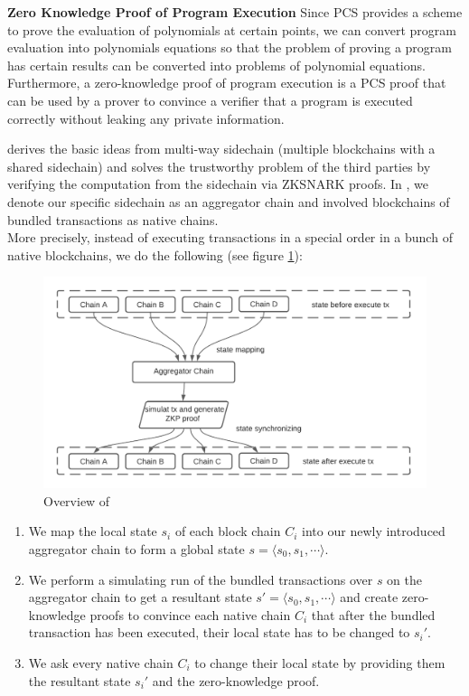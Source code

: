 \documentclass[pageno]{jpaper}
\begin{document}
\smallskip\noindent\textbf{Zero Knowledge Proof of Program Execution}
Since PCS provides a scheme to prove the evaluation of polynomials at certain points, we can convert program evaluation into polynomials equations so that the problem of proving a program has certain results can be converted into problems of polynomial equations. Furthermore, a zero-knowledge proof \cite{cramer1998zero-zkp,kate2010constant-zkp,damgaard1998commitment-zkp} of program execution is a PCS proof that can be used by a prover to convince a verifier that a program is executed correctly without leaking any private information.

\dprotocol derives the basic ideas from multi-way sidechain (multiple blockchains with a shared sidechain) and solves the trustworthy problem of the third parties by verifying the computation from the sidechain via ZKSNARK proofs. In \dprotocol, we denote our specific sidechain as an aggregator chain and involved blockchains of bundled transactions as native chains.\\
\newline
More precisely, instead of executing transactions in a special order in a bunch of native blockchains, we do the following (see figure \ref{main-idea}):

\begin{figure}[!ht]
\centerline{\includegraphics[scale=0.4]{main-idea}}
\caption{Overview of \dprotocol}\label{main-idea}
\end{figure}
\begin{enumerate}[leftmargin=*]
\item We map the local state $s_i$ of each block chain $C_i$ into our newly introduced aggregator chain to form a global state $s = \langle s_0, s_1, \cdots \rangle$.
\item We perform a simulating run of the bundled transactions over $s$ on the aggregator chain to get a resultant state $s' = \langle s_0, s_1, \cdots \rangle$ and create zero-knowledge proofs to convince each native chain $C_i$ that after the bundled transaction has been executed, their local state has to be changed to $s_i'$.
\item We ask every native chain $C_i$ to change their local state by providing them the resultant state $s_i'$ and the zero-knowledge proof.
\end{enumerate}
\end{document}
